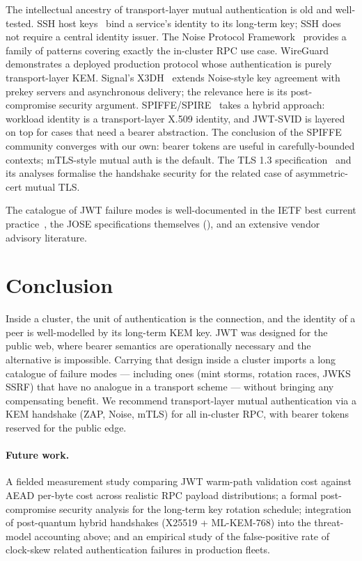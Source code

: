 \documentclass[11pt,a4paper]{article}
\theoremstyle{plain}
\theoremstyle{definition}
\begin{document}
The intellectual ancestry of transport-layer mutual authentication is
old and well-tested. SSH host keys~\cite{ylonen2006rfc4251} bind a
service's identity to its long-term key; SSH does not require a central
identity issuer. The Noise Protocol Framework~\cite{perrin2018noise}
provides a family of patterns covering exactly the in-cluster RPC use
case. WireGuard~\cite{donenfeld2017wireguard} demonstrates a deployed
production protocol whose authentication is purely transport-layer KEM.
Signal's X3DH~\cite{marlinspike2016x3dh} extends Noise-style key
agreement with prekey servers and asynchronous delivery; the relevance
here is its post-compromise security argument. SPIFFE/SPIRE~\cite{spiffe}
takes a hybrid approach: workload identity is a transport-layer X.509
identity, and JWT-SVID is layered on top for cases that need a bearer
abstraction. The conclusion of the SPIFFE community converges with our
own: bearer tokens are useful in carefully-bounded contexts; mTLS-style
mutual auth is the default. The TLS 1.3 specification~\cite{rfc8446} and
its analyses formalise the handshake security for the related case of
asymmetric-cert mutual TLS.

The catalogue of JWT failure modes is well-documented in the IETF best
current practice~\cite{ietfjwtbcp}, the JOSE specifications themselves
(\cite{rfc7515,rfc7518,rfc7519}), and an extensive vendor advisory
literature.

\section{Conclusion}
\label{sec:conclusion}

Inside a cluster, the unit of authentication is the connection, and the
identity of a peer is well-modelled by its long-term KEM key. JWT was
designed for the public web, where bearer semantics are operationally
necessary and the alternative is impossible. Carrying that design
inside a cluster imports a long catalogue of failure modes --- including
ones (mint storms, rotation races, JWKS SSRF) that have no analogue in a
transport scheme --- without bringing any compensating benefit. We
recommend transport-layer mutual authentication via a KEM handshake
(ZAP, Noise, mTLS) for all in-cluster RPC, with bearer tokens reserved
for the public edge.

\paragraph{Future work.} A fielded measurement study comparing JWT
warm-path validation cost against AEAD per-byte cost across realistic
RPC payload distributions; a formal post-compromise security analysis
for the long-term key rotation schedule; integration of post-quantum
hybrid handshakes (X25519 + ML-KEM-768) into the threat-model accounting
above; and an empirical study of the false-positive rate of clock-skew
related authentication failures in production fleets.
\end{document}
